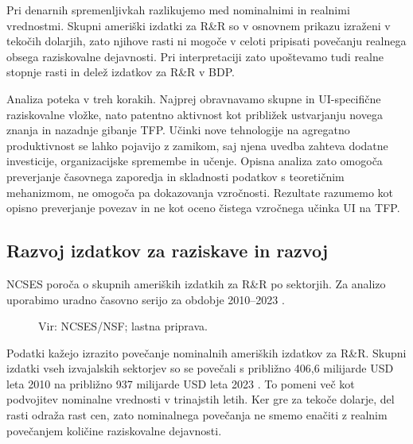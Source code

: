 \documentclass[12pt,a4paper]{article}
\begin{document}
Pri denarnih spremenljivkah razlikujemo med nominalnimi in realnimi vrednostmi. Skupni ameriški izdatki za R\&R so v osnovnem prikazu izraženi v tekočih dolarjih, zato njihove rasti ni mogoče v celoti pripisati povečanju realnega obsega raziskovalne dejavnosti. Pri interpretaciji zato upoštevamo tudi realne stopnje rasti in delež izdatkov za R\&R v BDP.

Analiza poteka v treh korakih. Najprej obravnavamo skupne in UI-specifične raziskovalne vložke, nato patentno aktivnost kot približek ustvarjanju novega znanja in nazadnje gibanje TFP. Učinki nove tehnologije na agregatno produktivnost se lahko pojavijo z zamikom, saj njena uvedba zahteva dodatne investicije, organizacijske spremembe in učenje. Opisna analiza zato omogoča preverjanje časovnega zaporedja in skladnosti podatkov s teoretičnim mehanizmom, ne omogoča pa dokazovanja vzročnosti. Rezultate razumemo kot opisno preverjanje povezav in ne kot oceno čistega vzročnega učinka UI na TFP.

\subsection{Razvoj izdatkov za raziskave in razvoj}

NCSES poroča o skupnih ameriških izdatkih za R\&R po sektorjih. Za analizo uporabimo uradno časovno serijo za obdobje 2010--2023 \parencite{ncses2026}.

\begin{figure}[H]
\centering
{}
\caption{Skupni izdatki za R\&R v ZDA, 2010--2023}
\caption*{\footnotesize Vir: NCSES/NSF; lastna priprava.}
\label{fig:rnd}
\end{figure}

Podatki kažejo izrazito povečanje nominalnih ameriških izdatkov za R\&R. Skupni izdatki vseh izvajalskih sektorjev so se povečali s približno 406,6 milijarde USD leta 2010 na približno 937 milijarde USD leta 2023 \parencite{ncses2026}. To pomeni več kot podvojitev nominalne vrednosti v trinajstih letih. Ker gre za tekoče dolarje, del rasti odraža rast cen, zato nominalnega povečanja ne smemo enačiti z realnim povečanjem količine raziskovalne dejavnosti.
\end{document}
